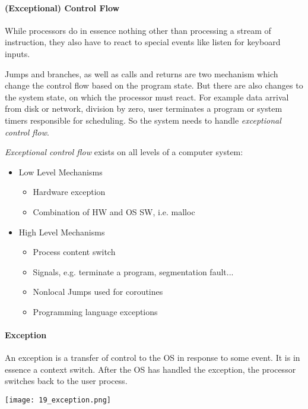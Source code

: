 
\paragraph{(Exceptional) Control Flow}
While processors do in essence nothing other than processing a stream of instruction, they also have to react to special events like listen for keyboard inputs. 

Jumps and branches, as well as calls and returns are two mechanism which change the control flow based on the program state. But there are also changes to the system state, on which the processor must react. For example data arrival from disk or network, division by zero, user terminates a program or system timers responsible for scheduling. So the system needs to handle \textit{exceptional control flow}.

\textit{Exceptional control flow} exists on all levels of a computer system:
\begin{itemize}
    \item Low Level Mechanisms
        \begin{itemize}
            \item Hardware exception
            \item Combination of HW and OS SW, i.e. malloc
        \end{itemize}
    \item High Level Mechanisms
        \begin{itemize}
            \item Process content switch
            \item Signals, e.g. terminate a program, segmentation fault...
            \item Nonlocal Jumps used for coroutines
            \item Programming language exceptions
        \end{itemize}
\end{itemize}

\paragraph{Exception}
An exception is a transfer of control to the OS in response to some event. It is in essence a context switch. After the OS has handled the exception, the processor switches back to the user process.

\texttt{[image: 19\_exception.png]}


